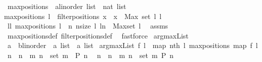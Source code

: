 \begin{isabellebody}
\isanewline
{}\isamarkupfalse%
\ maxpositions\ {\isacharcolon}{\isacharcolon}\ {\isachardoublequoteopen}{\isacharprime}a{\isacharcolon}{\isacharcolon}linorder\ list\ {\isacharequal}{\isachargreater}\ nat\ list{\isachardoublequoteclose}\ \isanewline
{\isachardoublequoteopen}maxpositions\ l\ {\isacharequal}\ filterpositions{}\ {\isacharparenleft}{\isacharpercent}x\ {\isachardot}\ x\ {\isasymge}\ Max\ {\isacharparenleft}set\ l{\isacharparenright}{\isacharparenright}\ l{\isachardoublequoteclose}\isanewline
\isanewline
{}\isamarkupfalse%
\ ll{}{\isacharcolon}\ {\isachardoublequoteopen}maxpositions\ l\ {\isacharequal}\ {\isacharbrackleft}n{\isachardot}\ n{\isasymleftarrow}{\isacharbrackleft}{}{\isachardot}{\isachardot}{\isacharless}size\ l{\isacharbrackright}{\isacharcomma}\ l{\isacharbang}n\ {\isasymge}\ Max{\isacharparenleft}set\ l{\isacharparenright}{\isacharbrackright}{\isachardoublequoteclose}\ \isanewline
%
\isadelimproof
%
\endisadelimproof
%
\isatagproof
{}\isamarkupfalse%
\ assms\ \isamarkupfalse%
\ maxpositions{\isacharunderscore}def\ filterpositions{}{\isacharunderscore}def\ \isamarkupfalse%
\ fastforce%
\endisatagproof
{\isafoldproof}%
%
\isadelimproof
\isanewline
%
\endisadelimproof
\isanewline
{}\isamarkupfalse%
\ argmaxList\isanewline
{\isacharcolon}{\isacharcolon}\ {\isachardoublequoteopen}{\isacharparenleft}{\isacharprime}a\ {\isacharequal}{\isachargreater}\ {\isacharparenleft}{\isacharprime}b{\isacharcolon}{\isacharcolon}linorder{\isacharparenright}{\isacharparenright}\ {\isacharequal}{\isachargreater}\ {\isacharprime}a\ list\ {\isacharequal}{\isachargreater}\ {\isacharprime}a\ list{\isachardoublequoteclose}\isanewline
{}\ {\isachardoublequoteopen}argmaxList\ f\ l\ {\isacharequal}\ map\ {\isacharparenleft}nth\ l{\isacharparenright}\ {\isacharparenleft}maxpositions\ {\isacharparenleft}map\ f\ l{\isacharparenright}{\isacharparenright}{\isachardoublequoteclose}\isanewline
\isanewline
{}\isamarkupfalse%
\ {\isachardoublequoteopen}{\isacharbrackleft}n\ {\isachardot}\ n\ {\isacharless}{\isacharminus}\ {\isacharbrackleft}{}{\isachardot}{\isachardot}{\isacharless}m{\isacharbrackright}{\isacharcomma}\ {\isacharparenleft}n\ {\isasymin}\ set\ {\isacharbrackleft}{}{\isachardot}{\isachardot}{\isacharless}m{\isacharbrackright}\ {\isacharampersand}\ P\ n{\isacharparenright}{\isacharbrackright}\ \isanewline
{\isacharequal}\ {\isacharbrackleft}n\ {\isachardot}\ n\ {\isacharless}{\isacharminus}\ {\isacharbrackleft}{}{\isachardot}{\isachardot}{\isacharless}m{\isacharbrackright}{\isacharcomma}\ n\ {\isasymin}\ set\ {\isacharbrackleft}{}{\isachardot}{\isachardot}{\isacharless}m{\isacharbrackright}{\isacharcomma}\ P\ n{\isacharbrackright}{\isachardoublequoteclose}%

\end{isabellebody}
